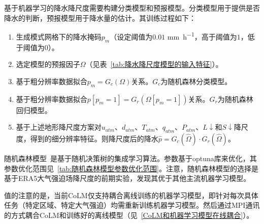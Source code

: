 基于机器学习的降水降尺度需要构建分类模型和预报模型。分类模型用于提供是否降水的判断，预报模型用于降水量的估计。其训练过程如下：

\begin{enumerate}
    \item 生成模式网格下的降水掩码$p_{m}$（设定阈值为$0.01$ \unit{mm.h^{-1}}，高于阈值为$1$，低于阈值为$0$）。
    \item 选定模型的预报因子$\Omega$（见表~\ref{tab:降水降尺度模型的输入特征}）。
    \item 基于粗分辨率数据拟合$p_{m}=G_{c}\left(\Omega\right)$关系。$G_{c}$为随机森林分类模型。
    \item 基于粗分辨率数据拟合$p[p_{m}=1]=G_{r}\left(\Omega[p_{m}=1]\right)$关系。$G_{r}$为随机森林回归模型。
    \item 基于上述地形降尺度方案对$u_{atm}$、$d_{atm}$、$T_{atm}$、$q_{atm}$、$P_{atm}$、$L\downarrow$和$S\downarrow$降尺度，得到的细分辨率特征。则降尺度后的降水$\hat{p}=G_{c}\left(\hat{\Omega}\right) \cdot G_{r}\left(\hat{\Omega}\right)$。
\end{enumerate}

随机森林模型~\citep{rf2001}是基于随机决策树的集成学习算法。参数基于optuna库来优化，其参数优化范围见~\ref{tab:随机森林模型参数优化范围}。注意，随机森林模型的选择是基于ERA5大气强迫场降尺度的前期实验，发现其优于其他主流机器学习模型。

值的注意的是，当前CoLM仅支持耦合离线训练的机器学习模型，即针对每次具体任务（特定区域、特定大气强迫）均需重新训练机器学习模型。然后通过MPI通讯的方式耦合CoLM和训练好的离线模型（见~\ref{CoLM和机器学习模型在线耦合}）。

